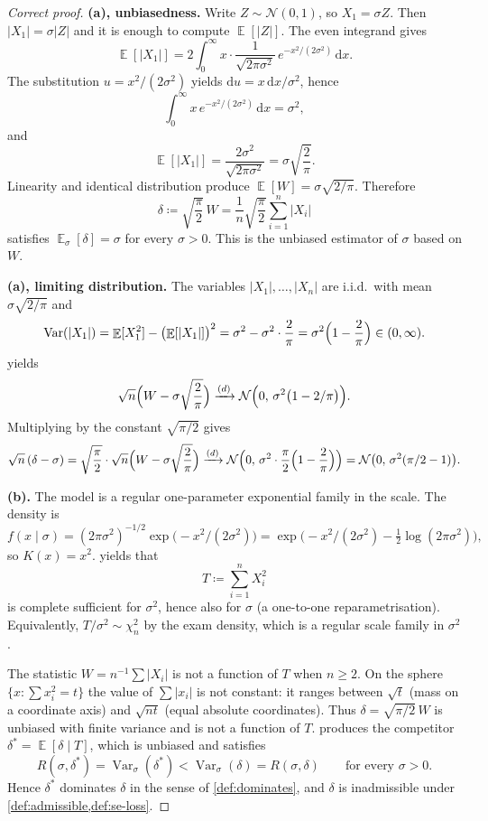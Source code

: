 \documentclass[11pt,a4paper]{article}
\DeclareMathOperator{\Var}{Var}
\DeclareMathOperator{\E}{\mathbb{E}}
\begin{document}
\begin{proof}[Correct proof]
\textbf{(a), unbiasedness.}
Write \( Z\sim\mathcal{N}(0,1) \), so \( X_1=\sigma Z \). Then \( |X_1|=\sigma|Z| \) and it is enough to compute \( \E[|Z|] \). The even integrand gives
\[
\E[|X_1|]
=
2\int_{0}^{\infty}x\cdot\frac{1}{\sqrt{2\pi\sigma^{2}}}\,e^{-x^{2}/(2\sigma^{2})}\,\mathrm{d}x.
\]
The substitution \( u=x^{2}/(2\sigma^{2}) \) yields \( \mathrm{d}u=x\,\mathrm{d}x/\sigma^{2} \), hence
\[
\int_{0}^{\infty}x\,e^{-x^{2}/(2\sigma^{2})}\,\mathrm{d}x
=
\sigma^{2},
\]
and
\[
\E[|X_1|]
=
\frac{2\sigma^{2}}{\sqrt{2\pi\sigma^{2}}}
=
\sigma\sqrt{\frac{2}{\pi}}.
\]
Linearity and identical distribution produce \( \E[W]=\sigma\sqrt{2/\pi} \). Therefore
\[
\delta
\coloneqq
\sqrt{\frac{\pi}{2}}\,W
=
\frac{1}{n}\sqrt{\frac{\pi}{2}}\sum_{i=1}^{n}|X_i|
\]
satisfies \( \E_\sigma[\delta]=\sigma \) for every \( \sigma>0 \). This is the unbiased estimator of \( \sigma \) based on \( W \).

\textbf{(a), limiting distribution.}
The variables \( |X_1|,\dots,|X_n| \) are i.i.d.\ with mean \( \sigma\sqrt{2/\pi} \) and
\[
\Var(|X_1|)
=
\E[X_1^{2}]
-
\bigl(\E[|X_1|]\bigr)^{2}
=
\sigma^{2}
-
\sigma^{2}\cdot\frac{2}{\pi}
=
\sigma^{2}\Bigl(1-\frac{2}{\pi}\Bigr)
\in
(0,\infty).
\]
 yields
\[
\sqrt{n}\Bigl(W-\sigma\sqrt{\frac{2}{\pi}}\Bigr)
\xrightarrow{(d)}
\mathcal{N}\Bigl(0,\,\sigma^{2}\bigl(1-2/\pi\bigr)\Bigr).
\]
Multiplying by the constant \( \sqrt{\pi/2} \) gives
\[
\sqrt{n}\,(\delta-\sigma)
=
\sqrt{\frac{\pi}{2}}\cdot\sqrt{n}\Bigl(W-\sigma\sqrt{\frac{2}{\pi}}\Bigr)
\xrightarrow{(d)}
\mathcal{N}\Bigl(0,\,\sigma^{2}\cdot\frac{\pi}{2}\Bigl(1-\frac{2}{\pi}\Bigr)\Bigr)
=
\mathcal{N}\bigl(0,\,\sigma^{2}(\pi/2-1)\bigr).
\]

\textbf{(b).}
The model is a regular one-parameter exponential family in the scale. The density is
\[
f(x\mid\sigma)
=
(2\pi\sigma^{2})^{-1/2}
\exp\bigl(-x^{2}/(2\sigma^{2})\bigr)
=
\exp\bigl(-x^{2}/(2\sigma^{2})-\tfrac12\log(2\pi\sigma^{2})\bigr),
\]
so \( K(x)=x^{2} \).  yields that
\[
T
\coloneqq
\sum_{i=1}^{n}X_i^{2}
\]
is complete sufficient for \( \sigma^{2} \), hence also for \( \sigma \) (a one-to-one reparametrisation). Equivalently, \( T/\sigma^{2}\sim\chi^{2}_{n} \) by the exam density, which is a regular scale family in \( \sigma^{2} \).

The statistic \( W=n^{-1}\sum|X_i| \) is not a function of \( T \) when \( n\ge 2 \). On the sphere \( \{x: \sum x_i^{2}=t\} \) the value of \( \sum|x_i| \) is not constant: it ranges between \( \sqrt{t} \) (mass on a coordinate axis) and \( \sqrt{n t} \) (equal absolute coordinates). Thus \( \delta=\sqrt{\pi/2}\,W \) is unbiased with finite variance and is not a function of \( T \).  produces the competitor \( \delta^{*}=\E[\delta\mid T] \), which is unbiased and satisfies
\[
R(\sigma,\delta^{*})
=
\Var_\sigma(\delta^{*})
<
\Var_\sigma(\delta)
=
R(\sigma,\delta)
\qquad\text{for every }\sigma>0.
\]
Hence \( \delta^{*} \) dominates \( \delta \) in the sense of \cref{def:dominates}, and \( \delta \) is inadmissible under \cref{def:admissible,def:se-loss}.


\end{proof}
\end{document}
